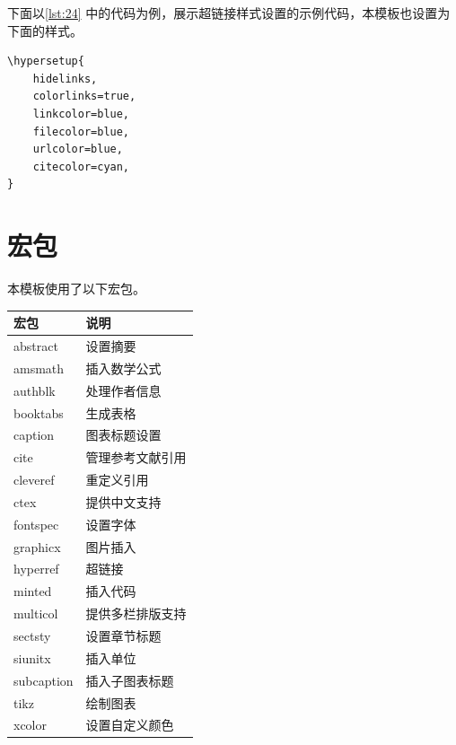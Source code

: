 \documentclass[a4paper]{article}
\begin{document}
下面以\cref{lst:24} 中的代码为例，展示超链接样式设置的示例代码，本模板也设置为下面的样式。

\begin{center}
    \label{lst:24}
    \begin{verbatim}
\hypersetup{
    hidelinks,
    colorlinks=true,
    linkcolor=blue,
    filecolor=blue,      
    urlcolor=blue,
    citecolor=cyan,
}
    \end{verbatim}
\end{center}

\section{宏包}

本模板使用了以下宏包。

\begin{center}
    \begin{tabular}{|m{}|m{}|}
        \hline
        宏包 & 说明 \\
        \hline
        abstract & 设置摘要 \\
        amsmath & 插入数学公式 \\
        authblk & 处理作者信息 \\
        booktabs & 生成表格 \\
        caption & 图表标题设置 \\
        cite & 管理参考文献引用 \\
        cleveref & 重定义引用 \\
        ctex & 提供中文支持 \\
        fontspec & 设置字体 \\
        graphicx & 图片插入 \\
        hyperref & 超链接 \\
        minted & 插入代码 \\
        multicol & 提供多栏排版支持 \\
        sectsty & 设置章节标题 \\
        siunitx & 插入单位 \\
        subcaption & 插入子图表标题 \\
        tikz & 绘制图表 \\
        xcolor & 设置自定义颜色 \\
        \hline
    \end{tabular}
\end{center}
\end{document}
